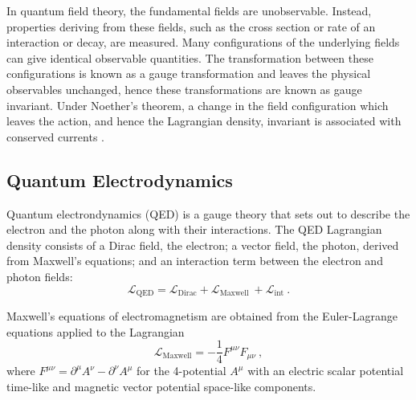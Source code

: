In quantum field theory, the fundamental fields are unobservable. Instead,
properties deriving from these fields, such as the cross section or rate of an
interaction or decay, are measured. Many configurations of the underlying
fields can give identical observable quantities. The transformation between
these configurations is known as a gauge transformation and leaves the
physical observables unchanged, hence these transformations are known as gauge
invariant. Under Noether's theorem, a change in the field configuration which
leaves the action, and hence the Lagrangian density, invariant is associated
with conserved currents \cite{doi:10.1080/00411457108231446}. 

\subsection{Quantum Electrodynamics}

Quantum electrondynamics (QED) is a gauge theory that sets out to describe the
electron and the photon along with their interactions. The QED Lagrangian
density consists of a Dirac field, the electron; a vector field, the photon,
derived from Maxwell's equations; and an interaction term between the electron
and photon fields:
%
\begin{equation}
    \mathcal{L}_{\mathrm{QED}} = \mathcal{L}_{\mathrm{Dirac}} + \mathcal{L}_{\mathrm{Maxwell}}\ + \mathcal{L}_{\mathrm{int}}\ .
\end{equation}

Maxwell's equations of electromagnetism are obtained from the Euler-Lagrange
equations applied to the Lagrangian
%
\begin{equation}
    \mathcal{L}_{\mathrm{Maxwell}} = -\frac{1}{4}F^{\mu\nu}F_{\mu\nu}\ ,
\end{equation}
%
where $F^{\mu\nu}=\partial^{\mu}A^{\nu}-\partial^{\nu}A^{\mu}$
\cite{Peskin:1995ev} for the 4-potential $A^{\mu}$ with an electric scalar
potential time-like and magnetic vector potential space-like components.

